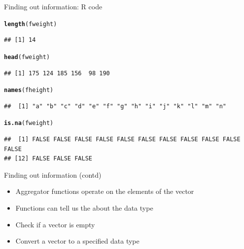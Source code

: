 \documentclass{beamer}\usepackage[]{graphicx}\usepackage[]{color}
\makeatletter
\newcommand{\hlstd}[1]{\textcolor[rgb]{0.345,0.345,0.345}{#1}}%
\newcommand{\hlkwd}[1]{\textcolor[rgb]{0.737,0.353,0.396}{\textbf{#1}}}%
\newenvironment{kframe}{%
 \def\at@end@of@kframe{}%
 \ifinner\ifhmode%
  \def\at@end@of@kframe{\end{minipage}}%
  \begin{minipage}{\columnwidth}%
 \fi\fi%
 \def\FrameCommand##1{\hskip\@totalleftmargin \hskip-\fboxsep
 \colorbox{shadecolor}{##1}\hskip-\fboxsep
     \hskip-\linewidth \hskip-\@totalleftmargin \hskip\columnwidth}%
 \MakeFramed {\advance\hsize-\width
   \@totalleftmargin\z@ \linewidth\hsize
   \@setminipage}}%
 {\par\unskip\endMakeFramed%
 \at@end@of@kframe}
\newenvironment{knitrout}{}{} %
\renewenvironment{knitrout}{\begin{singlespace}}{\end{singlespace}}
\theoremstyle{mystyle}
\makeatother
\begin{document}
\begin{frame}[fragile]{Finding out information: R code}
\begin{knitrout}
\color{fgcolor}\begin{kframe}
\begin{alltt}
\hlkwd{length}\hlstd{(fweight)}
\end{alltt}
\begin{verbatim}
## [1] 14
\end{verbatim}
\begin{alltt}
\hlkwd{head}\hlstd{(fweight)}
\end{alltt}
\begin{verbatim}
## [1] 175 124 185 156  98 190
\end{verbatim}
\begin{alltt}
\hlkwd{names}\hlstd{(fheight)}
\end{alltt}
\begin{verbatim}
##  [1] "a" "b" "c" "d" "e" "f" "g" "h" "i" "j" "k" "l" "m" "n"
\end{verbatim}
\begin{alltt}
\hlkwd{is.na}\hlstd{(fweight)}
\end{alltt}
\begin{verbatim}
##  [1] FALSE FALSE FALSE FALSE FALSE FALSE FALSE FALSE FALSE FALSE FALSE
## [12] FALSE FALSE FALSE
\end{verbatim}
\end{kframe}
\end{knitrout}
\end{frame}

\begin{frame}[fragile]{Finding out information (contd)}
\begin{itemize}
\item Aggregator functions operate on the elements of the vector
\item Functions can tell us the about the data type 
\item Check if a vector is empty
\item Convert a vector to a specified data type
\end{itemize}
\end{frame}
\end{document}
